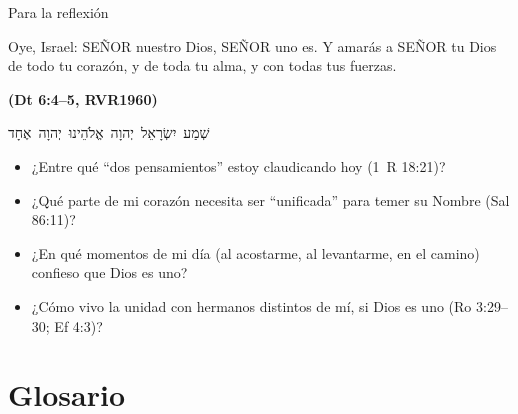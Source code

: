 \documentclass[hyperref={bookmarks=false},aspectratio=169]{beamer}
\newcommand{\heb}[1]{\mbox{\foreignlanguage{hebrew}{#1}}}
\newcommand{\SENOR}{S{\fontsize{0.78em}{1em}\selectfont EÑOR}}
\newcommand{\fuente}[1]{\par\hfill{\upshape\bfseries\footnotesize\textcolor{azul}{#1}}}
\begin{document}
\begin{frame}{Para la reflexión}
\begin{cita}Oye, Israel: \SENOR{} nuestro Dios, \SENOR{} uno es. Y amarás a \SENOR{} tu Dios de todo tu corazón, y de toda tu alma, y con todas tus fuerzas.\fuente{(Dt 6:4--5, RVR1960)}\end{cita}
\begin{center}\heb{שְׁמַע יִשְׂרָאֵל יְהוָה אֱלֹהֵינוּ יְהוָה אֶחָד}\end{center}
\small
\begin{itemize}
\item ¿Entre qué ``dos pensamientos'' estoy claudicando hoy (1~R 18:21)?
\item ¿Qué parte de mi corazón necesita ser ``unificada'' para temer su Nombre (Sal 86:11)?
\item ¿En qué momentos de mi día (al acostarme, al levantarme, en el camino) confieso que Dios es uno?
\item ¿Cómo vivo la unidad con hermanos distintos de mí, si Dios es uno (Ro 3:29--30; Ef 4:3)?
\end{itemize}
\end{frame}

\section{Glosario}
\end{document}

